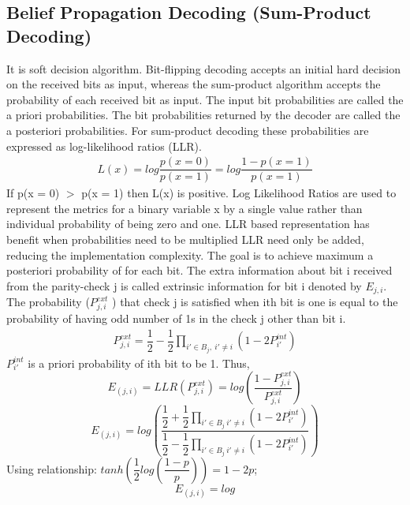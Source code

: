 \documentclass[twopage,12pt,a4paper]{report}
\begin{document}
\begin{raggedright}
\subsection{Belief Propagation Decoding (Sum-Product Decoding)} 


It is soft decision algorithm.
Bit-flipping decoding accepts an initial hard decision on
the received bits as input, whereas the sum-product algorithm accepts the probability of each received bit as input.
The input bit probabilities are called the a priori probabilities.
The bit probabilities returned by the decoder are called the a posteriori probabilities.
For sum-product decoding these probabilities are expressed
as log-likelihood ratios (LLR).
\begin{align} L(x)=log\dfrac{p(x=0)}{p(x=1)}=log\dfrac{1-p(x=1)}{p(x=1)} \end{align}
 If p(x = 0) $>$ p(x = 1) then L(x) is positive.
Log Likelihood Ratios are used to represent the metrics for a binary variable x
by a single value rather than individual probability of being zero and one.
LLR based representation has benefit when probabilities
need to be multiplied LLR need only be added, reducing the implementation complexity.
The goal is to achieve maximum a posteriori probability of for each bit. 
The extra information about bit i received
from the parity-check j is called extrinsic information for bit i denoted by $E_{j,i}$. The probability ($P_{j,i}^{ext}$ ) that check j is satisfied when ith bit is one is equal to the probability of having odd number of 1s in the check j other than bit i.
\begin{align} P_{j,i}^{ext} = \dfrac{1}{2}-\dfrac{1}{2} \prod_{i'\in B_j, \ i'\neq i }(1-2P_{i'}^{int})  \end{align}
$P_{i'}^{int}$ is a priori probability of ith bit to be 1. Thus,
\[ E_{(j,i)} =  LLR (P_{j,i}^{ext}) = log \left(
\dfrac{1-P_{j,i}^{ext}}{P_{j,i}^{ext}} 
\right)
\]
\[ E_{(j,i)} = log
\left(
\dfrac{\dfrac{1}{2}+\dfrac{1}{2} \prod_{i'\in B_j \ i'\neq i }(1-2P_{i'}^{int}) }{\dfrac{1}{2}-\dfrac{1}{2} \prod_{i'\in B_j \ i'\neq i }(1-2P_{i'}^{int}) } 
\right)
 \]
Using relationship: $tanh \left(  \dfrac{1}{2}log \left( \dfrac{1-p}{p} \right) \right)=1-2p$;
\[ E_{(j,i)} = log
\]
\end{raggedright}
\end{document}
